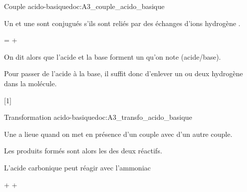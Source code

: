 \begin{doc}{Couple acido-basique}{doc:A3_couple_acido_basique}
  \begin{importants}
    Un  et une  sont conjugués s'ils sont reliés par des échanges d'ions hydrogène \ionHydrogene.
    \begin{center}
       =  + \ionHydrogene
    \end{center}
    On dit alors que l'acide et la base forment un  qu'on note  (acide/base).
  \end{importants}

  \attention Pour passer de l'acide à la base, il suffit donc d'enlever un ou deux hydrogène dans la molécule.
\end{doc}

[1]

\begin{doc}{Transformation acido-basique}{doc:A3_transfo_acido_basique}
  \begin{importants}
    Une  a lieue quand on met en présence  d'un couple avec  d'un autre couple.

    Les produits formés sont alors les  des deux réactifs.
  \end{importants}

  \exemple L'acide carbonique \acideCarbonique peut réagir avec l'ammoniac \ammoniac
  \begin{center}
    \acideCarbonique + \ammoniac \reaction \bicarbonate + \ammonium
  \end{center}
\end{doc}

